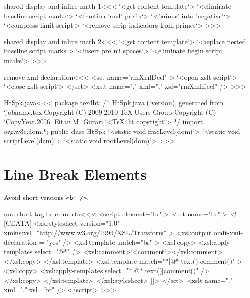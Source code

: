 \documentclass{article}
\begin{document}
\<shared display and inline math 1\><<<
`<get content template`>
`<eliminate baseline script marks`> 
`<fraction 'and' prefix`> 
`<'minus' into 'negative'`> 
`<compress limit script`>
`<remove scrip indicators from primes`> 
>>>


\<shared display and inline math 2\><<<
`<get content template`>
`<replace nested baseline script marks`>
`<insert pre mi spaces`>
`<eliminate begin script marks`> 
>>>




\<remove xml declaration\><<<
<set name="rmXmlDecl" >
  `<open xslt script`>
  `<close xslt script`>
</set>
<xslt name="." xml="." xsl="rmXmlDecl" />
>>>









\<HtSpk.java\><<<
package tex4ht;
/* HtSpk.java (`version), generated from `jobname.tex
   Copyright (C) 2009-2010 TeX Users Group
   Copyright (C) `CopyYear.2006. Eitan M. Gurari
`<TeX4ht copyright`> */
import org.w3c.dom.*;
public class HtSpk {
  `<static void fracLevel(dom)`>
  `<static void scriptLevel(dom)`>
  `<static void rootLevel(dom)`>
}
>>>


\section{Line Break Elements}

Avoid short versions \verb+<br />+.

\<non short tag br elements\><<<
<script element="br" >
  <set name="br" >
    <![CDATA[ 
       <xsl:stylesheet version="1.0"
          xmlns:xsl="http://www.w3.org/1999/XSL/Transform"
       >
          <xsl:output omit-xml-declaration = "yes" />
          <xsl:template match="br" >
            <xsl:copy>
              <xsl:apply-templates select="@*" />
              <xsl:comment>`<comment`></xsl:comment>
            </xsl:copy>
          </xsl:template> 
          <xsl:template match="*|@*|text()|comment()" >
            <xsl:copy>
              <xsl:apply-templates select="*|@*|text()|comment()" />
            </xsl:copy>
          </xsl:template>
       </xsl:stylesheet> 
    ]]>
  </set>
  <xslt name="." xml="." xsl="br" />
</script> 
>>>
\end{document}

